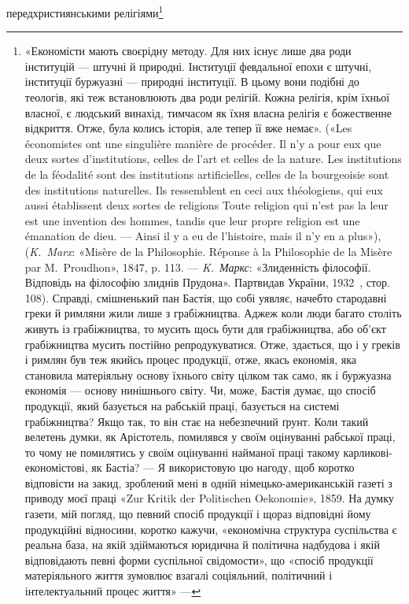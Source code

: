 передхристиянськими релігіями\footnote{
«Економісти мають своєрідну методу. Для них існує лише два
роди інституцій — штучні й природні. Інституції февдальної епохи є
штучні, інституції буржуазні — природні інституції. В цьому вони
подібні до теологів, які теж встановлюють два роди релігій. Кожна релігія,
крім їхньої власної, є людський винахід, тимчасом як їхня власна
релігія є божественне відкриття. Отже, була колись історія, але тепер
її вже немає». («Les économistes ont une singulière manière de procéder.
Il n’y a pour eux que deux sortes d’institutions, celles de l’art et celles de
la nature. Les institutions de la féodalité sont des institutions artificielles,
celles de la bourgeoisie sont des institutions naturelles. Ils ressemblent
en ceci aux théologiens, qui eux aussi établissent deux sortes de religions
Toute religion qui n’est pas la leur est une invention des hommes, tandis
que leur propre religion est une émanation de dieu. — Ainsi il y a eu de
l’histoire, mais il n’y en a plus»), (\emph{K.~Marx}: «Misère de la Philosophie.
Réponse à la Philosophie de la Misère par M.~Proudhon», 1847, p. 113. —
\emph{K.~Маркс}: «Злиденність філософії. Відповідь на філософію злиднів
Прудона». Партвидав України, 1932~, стор. 108). Справді, смішненький
пан Бастія, що собі уявляє, начебто стародавні греки й римляни жили
лише з грабіжництва. Аджеж коли люди багато століть живуть із грабіжництва,
то мусить щось бути для грабіжництва, або об’єкт грабіжництва
мусить постійно репродукуватися. Отже, здається, що і у греків і
римлян був теж якийсь процес продукції, отже, якась економія, яка
становила матеріяльну основу їхнього світу цілком так само, як і буржуазна
економія — основу нинішнього світу. Чи, може, Бастія думає,
що спосіб продукції, який базується на рабській праці, базується на системі
грабіжництва? Якщо так, то він стає на небезпечний ґрунт. Коли
такий велетень думки, як Арістотель, помилявся у своїм оцінуванні рабської
праці, то чому не помилятись у своїм оцінуванні найманої праці
такому карликові-економістові, як Бастіа? — Я використовую цю нагоду,
щоб коротко відповісти на закид, зроблений мені в одній німецько-американській
газеті з приводу моєї праці «Zur Kritik der Politischen
Oekonomie», 1859. На думку газети, мій погляд, що певний спосіб продукції
і щораз відповідні йому продукційні відносини, коротко кажучи,
«економічна структура суспільства є реальна база, на якій здіймаються
юридична й політична надбудова і якій відповідають певні форми
суспільної свідомости», що «спосіб продукції матеріяльного життя зумовлює
взагалі соціяльний, політичний і інтелектуальний процес життя» —
}
